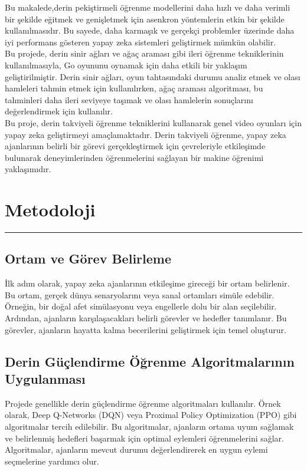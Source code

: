 \documentclass{article}
\begin{document}
Bu makalede,derin pekiştirmeli öğrenme modellerini daha hızlı ve daha verimli bir şekilde eğitmek ve genişletmek için asenkron yöntemlerin etkin bir şekilde kullanılmasıdır. Bu sayede, daha karmaşık ve gerçekçi problemler üzerinde daha iyi performans gösteren yapay zeka sistemleri geliştirmek mümkün olabilir\cite{mnih2016asynchronous}.\\[15pt]

Bu projede, derin sinir ağları ve ağaç araması gibi ileri öğrenme tekniklerinin kullanılmasıyla, Go oyununu oynamak için daha etkili bir yaklaşım geliştirilmiştir. Derin sinir ağları, oyun tahtasındaki durumu analiz etmek ve olası hamleleri tahmin etmek için kullanılırken, ağaç araması algoritması, bu tahminleri daha ileri seviyeye taşımak ve olası hamlelerin sonuçlarını değerlendirmek için kullanılır\cite{silver2016mastering}.\\[15pt]

Bu proje, derin takviyeli öğrenme tekniklerini kullanarak genel video oyunları için yapay zeka geliştirmeyi amaçlamaktadır. Derin takviyeli öğrenme, yapay zeka ajanlarının belirli bir görevi gerçekleştirmek için çevreleriyle etkileşimde bulunarak deneyimlerinden öğrenmelerini sağlayan bir makine öğrenimi yaklaşımıdır.\cite{torrado2018deep}


\newpage
\section{Metodoloji}
\rule{\textwidth}{0.5pt}
\subsection{Ortam ve Görev Belirleme}
İlk adım olarak, yapay zeka ajanlarının etkileşime gireceği bir ortam belirlenir. Bu ortam, gerçek dünya senaryolarını veya sanal ortamları simüle edebilir. Örneğin, bir doğal afet simülasyonu veya engellerle dolu bir alan seçilebilir. Ardından, ajanların karşılaşacakları belirli görevler ve hedefler tanımlanır. Bu görevler, ajanların hayatta kalma becerilerini geliştirmek için temel oluşturur.
\subsection{Derin Güçlendirme Öğrenme Algoritmalarının Uygulanması}
Projede genellikle derin güçlendirme öğrenme algoritmaları kullanılır. Örnek olarak, Deep Q-Networks (DQN) veya Proximal Policy Optimization (PPO) gibi algoritmalar tercih edilebilir. Bu algoritmalar, ajanların ortama uyum sağlamak ve belirlenmiş hedefleri başarmak için optimal eylemleri öğrenmelerini sağlar. Algoritmalar, ajanların mevcut durumu değerlendirerek en uygun eylemi seçmelerine yardımcı olur.
\end{document}
